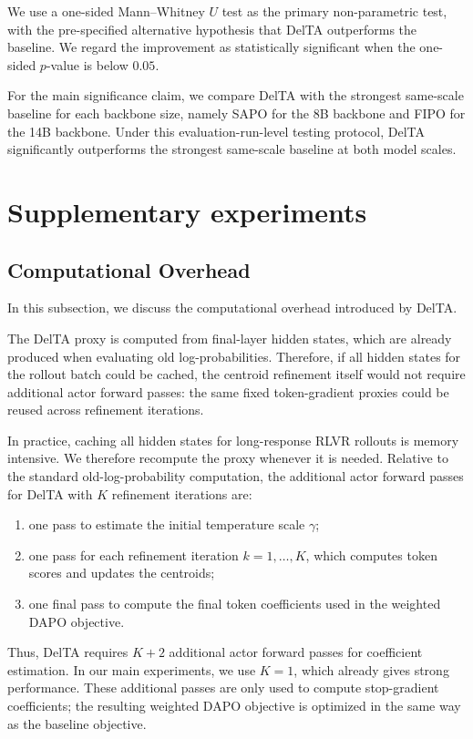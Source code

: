 \documentclass{llmxive}
\begin{document}
We use a one-sided Mann--Whitney \(U\) test as the primary non-parametric test, with the pre-specified alternative hypothesis that DelTA outperforms the baseline. We regard the improvement as statistically significant when the one-sided \(p\)-value is below \(0.05\).

For the main significance claim, we compare DelTA with the strongest same-scale baseline for each backbone size, namely SAPO for the 8B backbone and FIPO for the 14B backbone.
Under this evaluation-run-level testing protocol, DelTA significantly outperforms the strongest same-scale baseline at both model scales.

\section{Supplementary experiments}

\subsection{Computational Overhead}
\label{app:expense}

In this subsection, we discuss the computational overhead introduced by DelTA.

The DelTA proxy is computed from final-layer hidden states, which are already
produced when evaluating old log-probabilities. Therefore, if all hidden states
for the rollout batch could be cached, the centroid refinement itself would not
require additional actor forward passes: the same fixed token-gradient proxies
could be reused across refinement iterations.

In practice, caching all hidden states for long-response RLVR rollouts is memory
intensive. We therefore recompute the proxy whenever it is needed. Relative to
the standard old-log-probability computation, the additional actor forward passes
for DelTA with \(K\) refinement iterations are:

\begin{enumerate}
    \item one pass to estimate the initial temperature scale \(\gamma\);
    \item one pass for each refinement iteration \(k=1,\dots,K\), which computes
    token scores and updates the centroids;
    \item one final pass to compute the final token coefficients used in the
    weighted DAPO objective.
\end{enumerate}

Thus, DelTA requires \(K+2\) additional actor forward passes for coefficient
estimation. In our main experiments, we use \(K=1\), which already gives strong
performance. These additional passes are only used to compute stop-gradient
coefficients; the resulting weighted DAPO objective is optimized in the same way
as the baseline objective.
\end{document}
